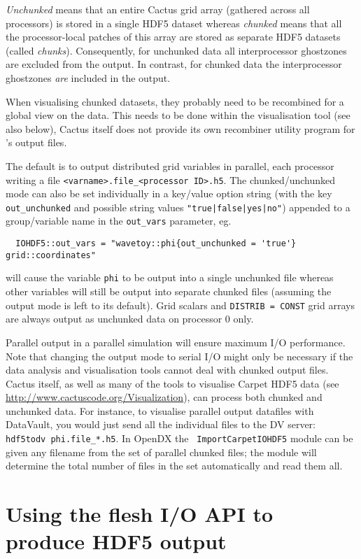 \documentclass{article}
\begin{document}
{\em Unchunked} means that an entire Cactus grid array (gathered across all
processors) is stored in a single HDF5 dataset whereas {\em chunked} means
that all the processor-local patches of this array are stored as separate
HDF5 datasets (called {\it chunks}).
Consequently, for unchunked data all interprocessor ghostzones are excluded
from the output.  In contrast, for chunked data the interprocessor ghostzones
\emph{are} included in the output.

When visualising chunked datasets, they probably need to be recombined
for a global view on the data. This needs to be done within the visualisation
tool (see also below), Cactus itself does not provide its own recombiner
utility program for \ThisThorn's output files.

The default is to output distributed grid variables in parallel, each processor
writing a file
{\tt \textless varname\textgreater.file\_\textless processor ID\textgreater.h5}.
The chunked/unchunked mode can also be set individually in a key/value
option string (with the key {\tt out\_unchunked} and possible string values
{\tt "true|false|yes|no"}) appended to a group/variable name in the
{\tt out\_vars} parameter, eg.
\begin{verbatim}
  IOHDF5::out_vars = "wavetoy::phi{out_unchunked = 'true'}  grid::coordinates"
\end{verbatim}
will cause the variable {\tt phi} to be output into a single unchunked file
whereas other variables will still be output into separate chunked files
(assuming the output mode is left to its default).
Grid scalars
and {\tt DISTRIB = CONST} grid arrays are always output as unchunked data
on processor 0 only.

Parallel output in a parallel simulation will ensure maximum I/O
performance. Note that changing the output mode to serial I/O might only be
necessary if the data analysis and visualisation tools cannot deal with
chunked output files. Cactus itself, as well as many of the tools to
visualise Carpet HDF5 data
(see \url{http://www.cactuscode.org/Visualization}),
can process both chunked and unchunked data. For instance, to visualise parallel
output datafiles with DataVault, you would just send all the individual files
to the DV server: {\tt hdf5todv phi.file\_*.h5}. In OpenDX the {\tt
ImportCarpetIOHDF5} module can be given any filename from the set of parallel
chunked files; the module will determine the total number of files in the set
automatically and read them all.


\section{Using the flesh I/O API to produce HDF5 output}
\end{document}
